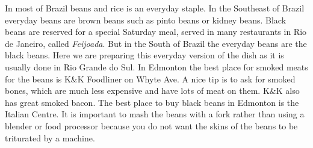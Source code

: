 \documentclass[11pt,letterpaper]{article}
\begin{document}


In most of Brazil beans and rice is an everyday staple.
In the Southeast of Brazil everyday beans are brown beans such as pinto beans or kidney beans. Black beans are reserved for a special Saturday meal, served in many restaurants in Rio de Janeiro, called {\it Feijoada}. But in the South of Brazil the everyday beans are the black beans. Here we are preparing this everyday version of the dish as it is usually done in Rio Grande do  Sul. In Edmonton the best place for smoked meats for the beans is K\&K Foodliner on Whyte Ave. A nice tip is to ask for smoked bones, which are much less expensive and have lots of meat on them. K\&K also has great smoked bacon. The best place to buy black beans in Edmonton is the Italian Centre. It is important to mash the beans with a fork rather than using a blender or food processor because you do not want the skins of the beans to be triturated by a machine.

\vspace{0.3in}
\end{document}
